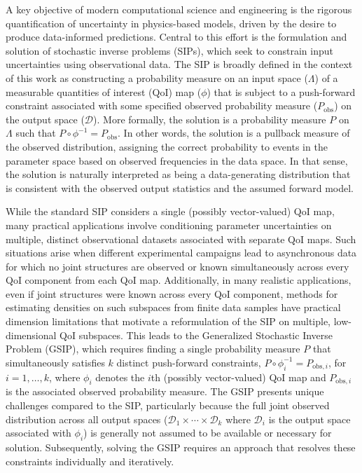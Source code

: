 \documentclass{article}
\newcommand{\dspace}{\mathcal{D}}
\begin{document}
A key objective of modern computational science and engineering is the rigorous quantification of uncertainty in physics-based models, driven by the desire to produce data-informed predictions. 
Central to this effort is the formulation and solution of stochastic inverse problems (SIPs), which seek to constrain input uncertainties using observational data. 
The SIP is broadly defined in the context of this work as constructing a probability measure on an input space ($\Lambda$) of a measurable quantities of interest (QoI) map ($\phi$) that is subject to a push-forward constraint associated with some specified observed probability measure ($P_{\text{obs}}$) on the output space ($\dspace$). 
More formally, the solution is a probability measure $P$ on $\Lambda$ such that $P \circ \phi^{-1} = P_{\text{obs}}$. 
In other words, the solution is a pullback measure of the observed distribution, assigning the correct probability to events in the parameter space based on observed frequencies in the data space.
In that sense, the solution is naturally interpreted as being a data-generating distribution that is consistent with the observed output statistics and the assumed forward model. 

While the standard SIP considers a single (possibly vector-valued) QoI map, many practical applications involve conditioning parameter uncertainties on multiple, distinct observational datasets associated with separate QoI maps.
Such situations arise when different experimental campaigns lead to asynchronous data for which no joint structures are observed or known simultaneously across every QoI component from each QoI map. 
Additionally, in many realistic applications, even if joint structures were known across every QoI component, methods for estimating densities on such subspaces from finite data samples have practical dimension limitations that motivate a reformulation of the SIP on multiple, low-dimensional QoI subspaces.
This leads to the Generalized Stochastic Inverse Problem (GSIP), which requires finding a single probability measure $P$ that simultaneously satisfies $k$ distinct push-forward constraints, $P \circ \phi_i^{-1} = P_{\text{obs},i}$, for $i=1, \dots, k$, where $\phi_i$ denotes the $i$th (possibly vector-valued) QoI map and $P_{\text{obs},i}$ is the associated observed probability measure.
The GSIP presents unique challenges compared to the SIP, particularly because the full joint observed distribution across all output spaces ($\dspace_1 \times \cdots \times \dspace_k$ where $\dspace_i$ is the output space associated with $\phi_i$) is generally not assumed to be available or necessary for solution. 
Subsequently, solving the GSIP requires an approach that resolves these constraints individually and iteratively.
\end{document}
